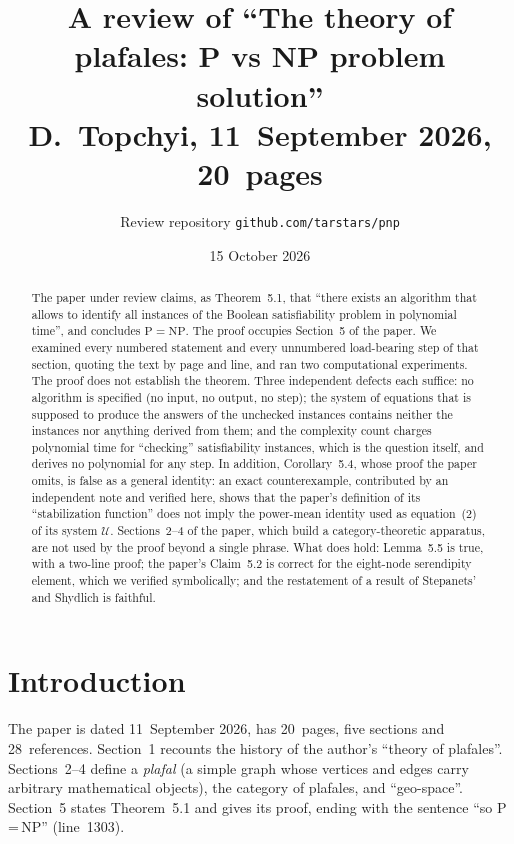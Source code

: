 \documentclass[11pt,a4paper]{article}
\title{A review of ``The theory of plafales: P vs NP problem solution''\\
\large D.~Topchyi, 11~September 2026, 20~pages}
\author{Review repository \texttt{github.com/tarstars/pnp}}
\date{15 October 2026}
\newcommand{\paperline}[1]{(line~#1)}
\begin{document}
\maketitle

\begin{abstract}
The paper under review claims, as Theorem~5.1, that ``there exists an algorithm that allows to identify all instances of the Boolean satisfiability problem in polynomial time'', and concludes $\mathrm{P}=\mathrm{NP}$. The proof occupies Section~5 of the paper. We examined every numbered statement and every unnumbered load-bearing step of that section, quoting the text by page and line, and ran two computational experiments. The proof does not establish the theorem. Three independent defects each suffice: no algorithm is specified (no input, no output, no step); the system of equations that is supposed to produce the answers of the unchecked instances contains neither the instances nor anything derived from them; and the complexity count charges polynomial time for ``checking'' satisfiability instances, which is the question itself, and derives no polynomial for any step. In addition, Corollary~5.4, whose proof the paper omits, is false as a general identity: an exact counterexample, contributed by an independent note and verified here, shows that the paper's definition of its ``stabilization function'' does not imply the power-mean identity used as equation~(2) of its system $\mathcal U$. Sections~2--4 of the paper, which build a category-theoretic apparatus, are not used by the proof beyond a single phrase. What does hold: Lemma~5.5 is true, with a two-line proof; the paper's Claim~5.2 is correct for the eight-node serendipity element, which we verified symbolically; and the restatement of a result of Stepanets' and Shydlich is faithful.
\end{abstract}

\section{Introduction}

The paper \cite{topchyi} is dated 11~September 2026, has 20~pages, five sections and 28~references. Section~1 recounts the history of the author's ``theory of plafales''. Sections~2--4 define a \emph{plafal} (a simple graph whose vertices and edges carry arbitrary mathematical objects), the category of plafales, and ``geo-space''. Section~5 states Theorem~5.1 and gives its proof, ending with the sentence ``so P\,=\,NP'' \paperline{1303}.
\end{document}
